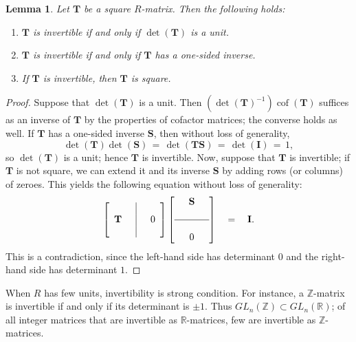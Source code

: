 \documentclass[11pt]{article}
\newtheorem{lemma}{Lemma}
\newcommand{\mat}[1]{\mathbf{#1}}
\newcommand{\cof}{\operatorname{cof}}
\begin{document}
\begin{adjustwidth}{0.5cm}{}
  \begin{lemma}
    Let $\mat{T}$ be a square $R$-matrix. Then the following holds:
    \begin{enumerate}
      \item $\mat{T}$ is invertible if and only if $\det(\mat{T})$ is a unit.
      \item $\mat{T}$ is invertible if and only if $\mat{T}$ has a one-sided inverse.
      \item If $\mat{T}$ is invertible, then $\mat{T}$ is square.
    \end{enumerate}
  \end{lemma}
  \begin{proof}
    Suppose that $\det(\mat{T})$ is a unit. Then $(\det(\mat{T})^{-1})\cof(\mat{T})$ suffices as an inverse of $\mat{T}$ by the properties of cofactor matrices; the converse holds as well. If $\mat{T}$ has a one-sided inverse $\mat{S}$, then without loss of generality,
    \[
      \det(\mat{T}) \det(\mat{S}) \, = \, \det(\mat{TS}) \, = \, \det(\mat{I}) \, = \, 1,
    \]
    so $\det(\mat{T})$ is a unit; hence $\mat{T}$ is invertible. Now, suppose that $\mat{T}$ is invertible; if $\mat{T}$ is not square, we can extend it and its inverse $\mat{S}$ by adding rows (or columns) of zeroes. This yields the following equation without loss of generality:
    \[
      \left[
      \begin{array}{c|c}
        \\ \mat{T} \quad  & \quad 0 \\ \\
      \end{array}
      \right] \left[
      \begin{array}{c}
        \quad \mat{S} \quad \\ \\ \hline \\ 0
      \end{array}
      \right] \quad = \quad \mat{I}.
    \]
    This is a contradiction, since the left-hand side has determinant $0$ and the right-hand side has determinant $1$.
  \end{proof}
\end{adjustwidth}

When $R$ has few units, invertibility is strong condition. For instance, a $\mathbb{Z}$-matrix is invertible if and only if its determinant is $\pm 1$. Thus $GL_{n}(\mathbb{Z}) \subset GL_{n}(\mathbb{R})$; of all integer matrices that are invertible as $\mathbb{R}$-matrices, few are invertible as $\mathbb{Z}$-matrices.
\end{document}

